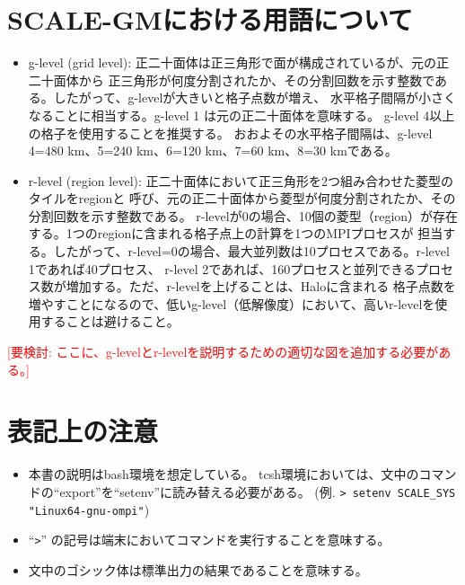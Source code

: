 \section{SCALE-GMにおける用語について}

 \begin{itemize}
   \item g-level (grid level): 正二十面体は正三角形で面が構成されているが、元の正二十面体から
正三角形が何度分割されたか、その分割回数を示す整数である。したがって、g-levelが大きいと格子点数が増え、
水平格子間隔が小さくなることに相当する。g-level 1 は元の正二十面体を意味する。
g-level 4以上の格子を使用することを推奨する。
おおよその水平格子間隔は、g-level 4=480 km、5=240 km、6=120 km、7=60 km、8=30 kmである。
   \item r-level (region level): 正二十面体において正三角形を2つ組み合わせた菱型のタイルをregionと
呼び、元の正二十面体から菱型が何度分割されたか、その分割回数を示す整数である。
r-levelが0の場合、10個の菱型（region）が存在する。1つのregionに含まれる格子点上の計算を1つのMPIプロセスが
担当する。したがって、r-level=0の場合、最大並列数は10プロセスである。r-level 1であれば40プロセス、
r-level 2であれば、160プロセスと並列できるプロセス数が増加する。ただ、r-levelを上げることは、Haloに含まれる
格子点数を増やすことになるので、低いg-level（低解像度）において、高いr-levelを使用することは避けること。
 \end{itemize}

\textcolor{red}{[要検討: ここに、g-levelとr-levelを説明するための適切な図を追加する必要がある。]}


\section{表記上の注意}
 \begin{itemize}
   \item 本書の説明はbash環境を想定している。
         tcsh環境においては、文中のコマンドの``export''を``setenv''に読み替える必要がある。
         (例. \verb|> setenv SCALE_SYS "Linux64-gnu-ompi"|)
   \item ``\verb|>|'' の記号は端末においてコマンドを実行することを意味する。
   \item 文中のゴシック体は標準出力の結果であることを意味する。
 \end{itemize}

